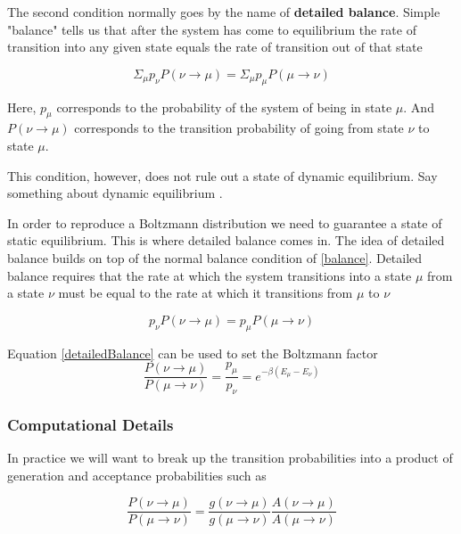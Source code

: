 \documentclass{article}
\begin{document}
The second condition normally goes by the name of \textbf{detailed balance}.
Simple "balance" tells us that after the system has come to equilibrium the rate of transition into any given state equals the rate of transition out of that state

\begin{equation}
\label{balance}
\Sigma_\mu p_\nu P(\nu\rightarrow\mu)
 = \Sigma_\mu p_\mu P(\mu\rightarrow\nu)
\end{equation}

Here, $p_\mu$ corresponds to the probability of the system of being in state $\mu$.
And $P(\nu\rightarrow\mu)$ corresponds to the transition probability of going from state $\nu$ to state $\mu$. 

This condition, however, does not rule out a state of dynamic equilibrium.
Say something about dynamic equilibrium \cite{dynamicEquilibriumExplain}.

In order to reproduce a Boltzmann distribution we need to guarantee a state of static equilibrium.
This is where detailed balance comes in.
The idea of detailed balance builds on top of the normal balance condition of \eqref{balance}.
Detailed balance requires that the rate at which the system transitions into a state $\mu$ from a state $\nu$ must be equal to the rate at which it transitions from $\mu$ to $\nu$

\begin{equation}
\label{detailedBalance}
p_\nu P(\nu\rightarrow\mu)
= p_\mu P(\mu\rightarrow\nu) 
\end{equation}

Equation \eqref{detailedBalance} can be used to set the Boltzmann factor
\begin{equation}
\frac{P(\nu\rightarrow\mu)}{P(\mu\rightarrow\nu)}
= \frac{p_\mu}{p_\nu}
= e^{-\beta (E_\mu - E_\nu)}
\end{equation}

\subsubsection{Computational Details}
In practice we will want to break up the transition probabilities into a product of generation and acceptance probabilities such as 

\begin{equation}
\frac{P(\nu\rightarrow\mu)}{P(\mu\rightarrow\nu)}
= \frac{g(\nu\rightarrow\mu)}{g(\mu\rightarrow\nu)}
  \frac{A(\nu\rightarrow\mu)}{A(\mu\rightarrow\nu)}
\end{equation}
\end{document}

